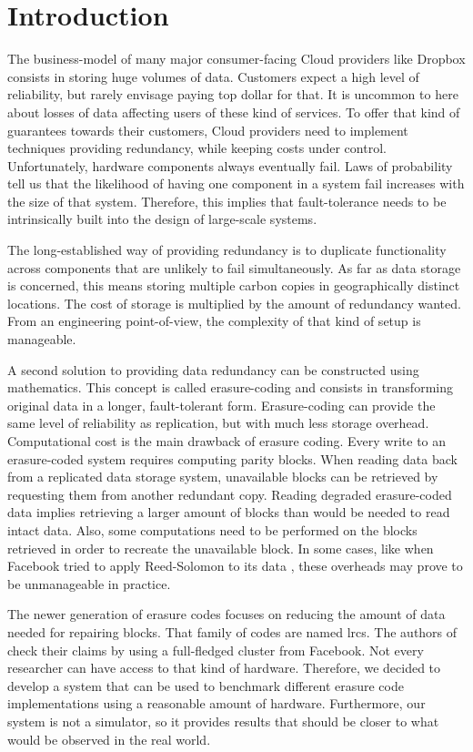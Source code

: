\chapter{Introduction}

The business-model of many major consumer-facing Cloud providers like Dropbox consists in storing huge volumes of data.
Customers expect a high level of reliability, but rarely envisage paying top dollar for that.
It is uncommon to here about losses of data affecting users of these kind of services.
To offer that kind of guarantees towards their customers, Cloud providers need to implement techniques providing redundancy, while keeping costs under control.
Unfortunately, hardware components always eventually fail.
Laws of probability tell us that the likelihood of having one component in a system fail increases with the size of that system.
Therefore, this implies that fault-tolerance needs to be intrinsically built into the design of large-scale systems.

The long-established way of providing redundancy is to duplicate functionality across components that are unlikely to fail simultaneously.
As far as data storage is concerned, this means storing multiple carbon copies in geographically distinct locations.
The cost of storage is multiplied by the amount of redundancy wanted.
From an engineering point-of-view, the complexity of that kind of setup is manageable.

A second solution to providing data redundancy can be constructed using mathematics.
This concept is called erasure-coding and consists in transforming original data in a longer, fault-tolerant form.
Erasure-coding can provide the same level of reliability as replication, but with much less storage overhead.
Computational cost is the main drawback of erasure coding.
Every write to an erasure-coded system requires computing parity blocks.
When reading data back from a replicated data storage system, unavailable blocks can be retrieved by requesting them from another redundant copy.
Reading degraded erasure-coded data implies retrieving a larger amount of blocks than would be needed to read intact data.
Also, some computations need to be performed on the blocks retrieved in order to recreate the unavailable block.
In some cases, like when Facebook tried to apply Reed-Solomon to its data \autocite{XorbasVLDB}, these overheads may prove to be unmanageable in practice.

The newer generation of erasure codes focuses on reducing the amount of data needed for repairing blocks.
That family of codes are named \acp{lrc}.
The authors of \autocite{XorbasVLDB} check their claims by using a full-fledged cluster from Facebook.
Not every researcher can have access to that kind of hardware.
Therefore, we decided to develop a system that can be used to benchmark different erasure code implementations using a reasonable amount of hardware.
Furthermore, our system is not a simulator, so it provides results that should be closer to what would be observed in the real world.

